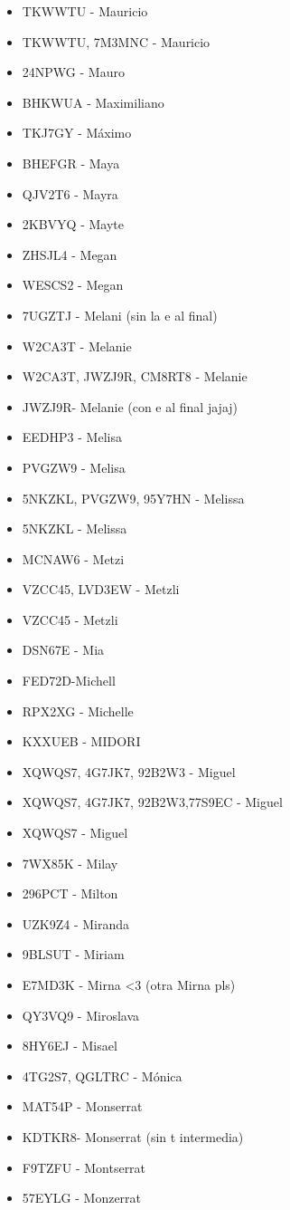 \begin{itemize}[leftmargin=*,nosep]
\item TKWWTU - Mauricio
\item TKWWTU, 7M3MNC - Mauricio
\item 24NPWG - Mauro
\item BHKWUA - Maximiliano
\item TKJ7GY - Máximo
\item BHEFGR - Maya
\item QJV2T6 - Mayra
\item 2KBVYQ - Mayte
\item ZHSJL4 - Megan
\item WESCS2 - Megan
\item 7UGZTJ - Melani (sin la e al final)
\item W2CA3T - Melanie
\item W2CA3T, JWZJ9R, CM8RT8 - Melanie
\item JWZJ9R- Melanie (con e al final jajaj)
\item EEDHP3 - Melisa
\item PVGZW9 - Melisa
\item 5NKZKL, PVGZW9, 95Y7HN - Melissa
\item 5NKZKL - Melissa
\item MCNAW6 - Metzi
\item VZCC45, LVD3EW - Metzli
\item VZCC45 - Metzli
\item DSN67E - Mia
\item FED72D-Michell
\item RPX2XG - Michelle
\item KXXUEB - MIDORI
\item XQWQS7, 4G7JK7, 92B2W3 - Miguel
\item XQWQS7, 4G7JK7, 92B2W3,77S9EC - Miguel
\item XQWQS7 - Miguel
\item 7WX85K - Milay
\item 296PCT - Milton
\item UZK9Z4 - Miranda
\item 9BLSUT - Miriam
\item E7MD3K - Mirna \textless{}3 (otra Mirna pls)
\item QY3VQ9 - Miroslava
\item 8HY6EJ - Misael
\item 4TG2S7, QGLTRC - Mónica
\item MAT54P - Monserrat
\item KDTKR8- Monserrat (sin t intermedia)
\item F9TZFU - Montserrat
\item 57EYLG - Monzerrat
\end{itemize}

